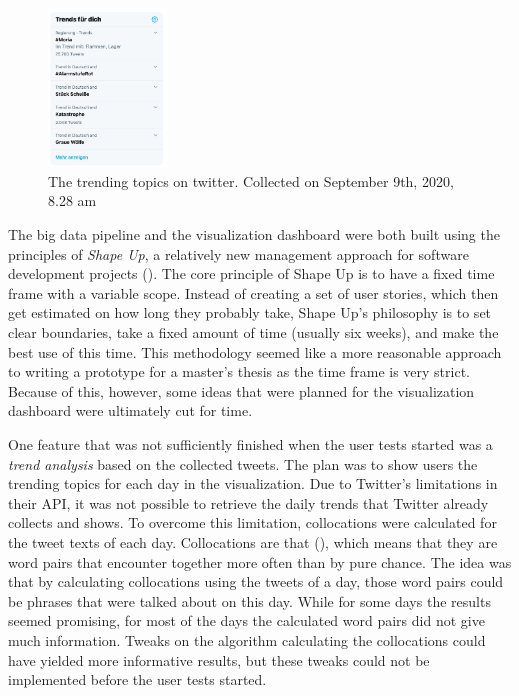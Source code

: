 \begin{figure}
    \includegraphics[width=0.28\textwidth]{images/twitter_trends.jpg}
    \caption{The trending topics on twitter. Collected on September 9th, 2020, 8.28 am}
    \label{fig:twitter_trends}
\end{figure}
The big data pipeline and the visualization dashboard were both built using the principles of \emph{Shape Up}, a relatively new management approach for software development projects (\cite{singerShapeStopRunning2019}). The core principle of Shape Up is to have a fixed time frame with a variable scope. Instead of creating a set of user stories, which then get estimated on how long they probably take, Shape Up's philosophy is to set clear boundaries, take a fixed amount of time (usually six weeks), and make the best use of this time. This methodology seemed like a more reasonable approach to writing a prototype for a master's thesis as the time frame is very strict.
Because of this, however, some ideas that were planned for the visualization dashboard were ultimately cut for time.

One feature that was not sufficiently finished when the user tests started was a \emph{trend analysis} based on the collected tweets. The plan was to show users the trending topics for each day in the visualization. Due to Twitter's limitations in their API, it was not possible to retrieve the daily trends that Twitter already collects and shows. 
To overcome this limitation, collocations were calculated for the tweet texts of each day. Collocations are  that  (\cite[2]{mckeown2000collocations}), which means that they are word pairs that encounter together more often than by pure chance. The idea was that by calculating collocations using the tweets of a day, those word pairs could be phrases that were talked about on this day. While for some days the results seemed promising, for most of the days the calculated word pairs did not give much information. Tweaks on the algorithm calculating the collocations could have yielded more informative results, but these tweaks could not be implemented before the user tests started.

